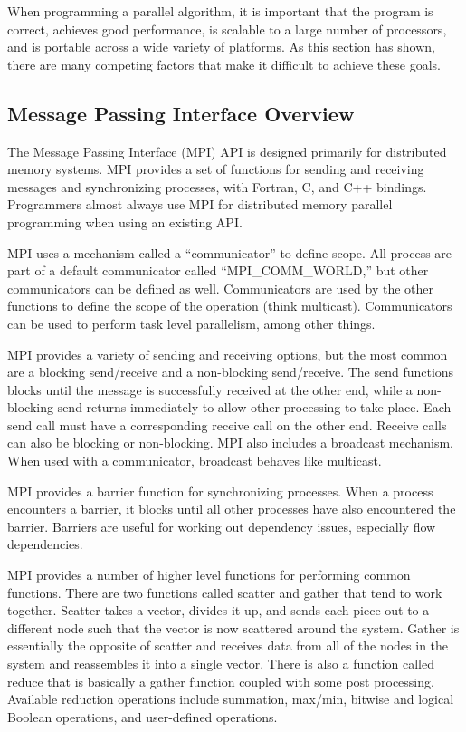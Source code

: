 When programming a parallel algorithm, it is important that the program is correct, achieves good performance, is scalable to a large number of processors, and is portable across a wide variety of platforms. As this section has shown, there are many competing factors that make it difficult to achieve these goals.

\subsection{Message Passing Interface Overview}\label{sec:api:background:mpi_overview}

The Message Passing Interface (MPI) API is designed primarily for distributed memory systems. MPI provides a set of functions for sending and receiving messages and synchronizing processes, with Fortran, C, and C++ bindings. Programmers almost always use MPI for distributed memory parallel programming when using an existing API. 

MPI uses a mechanism called a ``communicator'' to define scope. All process are part of a default communicator called ``MPI\_COMM\_WORLD,'' but other communicators can be defined as well. Communicators are used by the other functions to define the scope of the operation (think multicast). Communicators can be used to perform task level parallelism, among other things.

MPI provides a variety of sending and receiving options, but the most common are a blocking send/receive and a non-blocking send/receive. The send functions blocks until the message is successfully received at the other end, while a non-blocking send returns immediately to allow other processing to take place. Each send call must have a corresponding receive call on the other end. Receive calls can also be blocking or non-blocking. MPI also includes a broadcast mechanism. When used with a communicator, broadcast behaves like multicast.

MPI provides a barrier function for synchronizing processes. When a process encounters a barrier, it blocks until all other processes have also encountered the barrier. Barriers are useful for working out dependency issues, especially flow dependencies.

MPI provides a number of higher level functions for performing common functions. There are two functions called scatter and gather that tend to work together. Scatter takes a vector, divides it up, and sends each piece out to a different node such that the vector is now scattered around the system. Gather is essentially the opposite of scatter and receives data from all of the nodes in the system and reassembles it into a single vector. There is also a function called reduce that is basically a gather function coupled with some post processing. Available reduction operations include summation, max/min, bitwise and logical Boolean operations, and user-defined operations.

